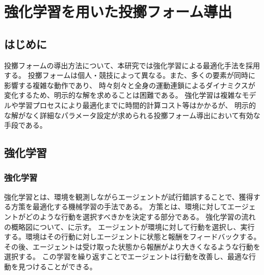 \chapter[強化学習を用いた投擲フォーム導出]{強化学習を用いた投擲フォーム導出}

\section{はじめに}
投擲フォームの導出方法について、本研究では強化学習による最適化手法を採用する。
投擲フォームは個人・競技によって異なる。また、多くの要素が同時に影響する複雑な動作であり、
時々刻々と全身の運動連鎖によるダイナミクスが変化するため、明示的な解を求めることは困難である。
強化学習は複雑なモデルや学習プロセスにより最適化までに時間的計算コスト等はかかるが、
明示的な解がなく詳細なパラメータ設定が求められる投擲フォーム導出において有効な手段である。
\section{強化学習}
\subsection{強化学習}
強化学習とは、環境を観測しながらエージェントが試行錯誤することで、獲得する方策を最適化する機械学習の手法である。
方策とは、環境に対してエージェントがどのような行動を選択すべきかを決定する部分である。
強化学習の流れの概略図について、に示す。
エージェントが環境に対して行動を選択し、実行する。環境はその行動に対しエージェントに状態と報酬をフィードバックする。
その後、エージェントは受け取った状態から報酬がより大きくなるような行動を選択する。
この学習を繰り返すことでエージェントは行動を改善し、最適な行動を見つけることができる。
